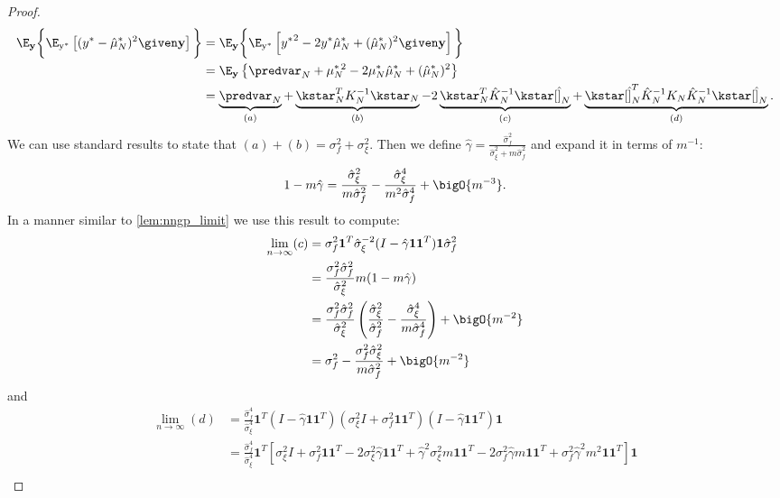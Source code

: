 \begin{proof}\label{proof:mismatched_mse_limit}
\begin{align*}
        \E_\mathbf{y}\bigg\{\E_\mathrm{y^*}\left[(y^* - \hat{\mu}_N^*)^2 \given \mathbf{y}\right] \bigg\}
        &= \E_\mathbf{y}\bigg\{\E_\mathrm{y^*}\left[{y^*}^2 - 2y^*\hat{\mu}_N^* + (\hat{\mu}_N^*)^2\given \mathbf{y}\right]\bigg\} \\
        &= \E_\mathbf{y}\left\{\predvar_N + \mu^{*\,2}_N - 2\mu^*_N\hat{\mu}_N^* + (\hat{\mu}_N^*)^2 \right\} \\
        &= \underbrace{\predvar_N}_{(a)} + \underbrace{\kstar_N^TK_N^{-1}{\kstar_N}}_{(b)} - 2\underbrace{\kstar_N^T\hat{K}_N^{-1}\kstar[\hat]_N}_{(c)} + \underbrace{\kstar[\hat]_N^T\hat{K}_N^{-1}K_N\hat{K}_N^{-1}\kstar[\hat]_N}_{(d)}.
    \end{align*}
    We can use standard results to state that \((a)+(b)=\sigma_f^2+\sigma_\xi^2\).
    Then we define \(\hat{\gamma}=\frac{\hat{\sigma}_f^2}{\hat{\sigma}_\xi^2+m\hat{\sigma}_f^2}\) and expand it in terms of \(m^{-1}\):
    \[1-m\hat{\gamma} = \frac{\hat{\sigma}_\xi^2}{m\hat{\sigma}_f^2} - \frac{\hat{\sigma}_\xi^4}{m^2\hat{\sigma}_f^4} + \bigO{m^{-3}}. \] 
    In a manner similar to \autoref{lem:nngp_limit} we use this result to compute:
    \begin{align*}
        \lim_{n\rightarrow\infty}(c) &= \sigma_f^2\bm{1}^T\hat{\sigma}_\xi^{-2}(I-\hat{\gamma}\bm{11}^T)\bm{1}\hat{\sigma}_f^2 \\
        &=\frac{\sigma_f^2\hat{\sigma}_f^2}{\hat{\sigma}_\xi^2}m(1-m\hat{\gamma})\\
        &=\frac{\sigma_f^2\hat{\sigma}_f^2}{\hat{\sigma}_\xi^2}\left(\frac{\hat{\sigma}_\xi^2}{\hat{\sigma}_f^2} - \frac{\hat{\sigma}_\xi^4}{m\hat{\sigma}_f^4}\right) + \bigO{m^{-2}} \\
        &= \sigma_f^2 - \frac{\sigma_f^2\hat{\sigma}_\xi^2}{m\hat{\sigma}_f^2} + \bigO{m^{-2}}
    \end{align*}
    and
    \begin{align*}
        \lim_{n\rightarrow\infty}(d) &= \frac{\hat{\sigma}_f^4}{\hat{\sigma}_\xi^4}\bm{1}^T(I-\hat{\gamma}\bm{11}^T)(\sigma_\xi^2I+\sigma_f^2\bm{11}^T)(I-\hat{\gamma}\bm{11}^T)\bm{1}\\
        &=\frac{\hat{\sigma}_f^4}{\hat{\sigma}_\xi^4}\bm{1}^T\left[\sigma_\xi^2I + \sigma_f^2\bm{11}^T - 2\sigma_\xi^2\hat{\gamma}\bm{11}^T + \hat{\gamma}^2\sigma_\xi^2m\bm{11}^T -2\sigma_f^2\hat{\gamma}m\bm{11}^T + \sigma_f^2\hat{\gamma}^2m^2\bm{11}^T\right]\bm{1}\\

\end{align*}
\end{proof}
